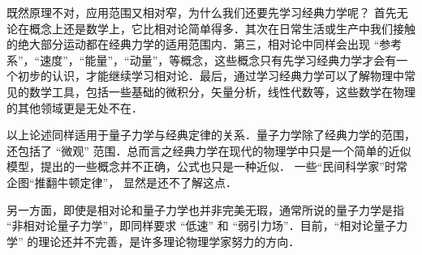 既然原理不对，应用范围又相对窄，为什么我们还要先学习经典力学呢？ 首先无论在概念上还是数学上，它比相对论简单得多．其次在日常生活或生产中我们接触的绝大部分运动都在经典力学的适用范围内．第三，相对论中同样会出现 “参考系”，“速度”，“能量”，“动量”，等概念，这些概念只有先学习经典力学才会有一个初步的认识，才能继续学习相对论．最后，通过学习经典力学可以了解物理中常见的数学工具，包括一些基础的微积分，矢量分析，线性代数等，这些数学在物理的其他领域更是无处不在．

以上论述同样适用于量子力学与经典定律的关系．量子力学除了经典力学的范围，还包括了 “微观” 范围．总而言之经典力学在现代的物理学中只是一个简单的近似模型，提出的一些概念并不正确，公式也只是一种近似． 一些“民间科学家”时常企图“推翻牛顿定律”， 显然是还不了解这点．

另一方面，即使是相对论和量子力学也并非完美无瑕，通常所说的量子力学是指 “非相对论量子力学”，即同样要求 “低速” 和 “弱引力场”．目前，“相对论量子力学” 的理论还并不完善，是许多理论物理学家努力的方向．




